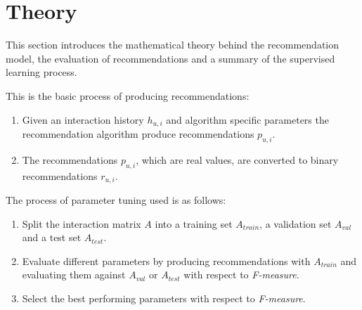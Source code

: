 
\section{Theory}\label{sec:theory}

This section introduces the mathematical theory behind the recommendation model, the evaluation of recommendations and a summary of the supervised learning process.

This is the basic process of producing recommendations:

\begin{enumerate}
    \item Given an interaction history $h_{u, i}$ and algorithm specific parameters the recommendation algorithm produce recommendations $p_{u, i}$.
    \item The recommendations $p_{u, i}$, which are real values, are converted to binary recommendations $r_{u, i}$.
\end{enumerate}

The process of parameter tuning used is as follows:

\begin{enumerate}
    \item Split the interaction matrix $A$ into a training set $A_{train}$, a validation set $A_{val}$ and a test set $A_{test}$.
    \item Evaluate different parameters by producing recommendations with $A_{train}$ and evaluating them against $A_{val}$ or $A_{test}$ with respect to \textit{F-measure}.
    \item Select the best performing parameters with respect to \textit{F-measure}.
\end{enumerate}














%

%
%
%

%

%
%
%

%

